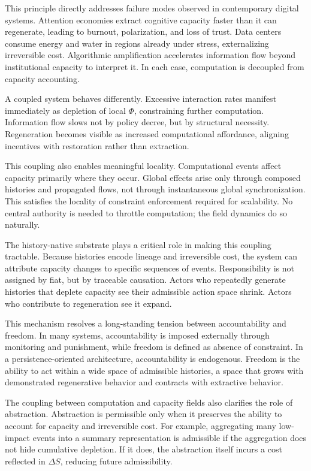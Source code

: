 \documentclass[12pt,oneside]{book}
\begin{document}
This principle directly addresses failure modes observed in contemporary digital systems. Attention economies extract cognitive capacity faster than it can regenerate, leading to burnout, polarization, and loss of trust. Data centers consume energy and water in regions already under stress, externalizing irreversible cost. Algorithmic amplification accelerates information flow beyond institutional capacity to interpret it. In each case, computation is decoupled from capacity accounting.

A coupled system behaves differently. Excessive interaction rates manifest immediately as depletion of local \(\Phi\), constraining further computation. Information flow slows not by policy decree, but by structural necessity. Regeneration becomes visible as increased computational affordance, aligning incentives with restoration rather than extraction.

This coupling also enables meaningful locality. Computational events affect capacity primarily where they occur. Global effects arise only through composed histories and propagated flows, not through instantaneous global synchronization. This satisfies the locality of constraint enforcement required for scalability. No central authority is needed to throttle computation; the field dynamics do so naturally.

The history-native substrate plays a critical role in making this coupling tractable. Because histories encode lineage and irreversible cost, the system can attribute capacity changes to specific sequences of events. Responsibility is not assigned by fiat, but by traceable causation. Actors who repeatedly generate histories that deplete capacity see their admissible action space shrink. Actors who contribute to regeneration see it expand.

This mechanism resolves a long-standing tension between accountability and freedom. In many systems, accountability is imposed externally through monitoring and punishment, while freedom is defined as absence of constraint. In a persistence-oriented architecture, accountability is endogenous. Freedom is the ability to act within a wide space of admissible histories, a space that grows with demonstrated regenerative behavior and contracts with extractive behavior.

The coupling between computation and capacity fields also clarifies the role of abstraction. Abstraction is permissible only when it preserves the ability to account for capacity and irreversible cost. For example, aggregating many low-impact events into a summary representation is admissible if the aggregation does not hide cumulative depletion. If it does, the abstraction itself incurs a cost reflected in \(\Delta S\), reducing future admissibility.
\end{document}

